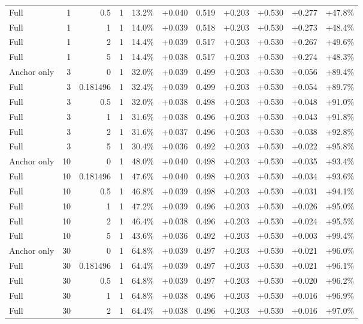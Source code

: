 \begin{table}[htbp]
\begin{tabular}{lrrrccccccc}
Full & 1 & 0.5 & 1 & 13.2\% & +0.040 & 0.519 & +0.203 & +0.530 & +0.277 & +47.8\% \\
Full & 1 & 1 & 1 & 14.0\% & +0.039 & 0.518 & +0.203 & +0.530 & +0.273 & +48.4\% \\
Full & 1 & 2 & 1 & 14.4\% & +0.039 & 0.517 & +0.203 & +0.530 & +0.267 & +49.6\% \\
Full & 1 & 5 & 1 & 14.4\% & +0.038 & 0.517 & +0.203 & +0.530 & +0.274 & +48.3\% \\
Anchor only & 3 & 0 & 1 & 32.0\% & +0.039 & 0.499 & +0.203 & +0.530 & +0.056 & +89.4\% \\
Full & 3 & 0.181496 & 1 & 32.4\% & +0.039 & 0.499 & +0.203 & +0.530 & +0.054 & +89.7\% \\
Full & 3 & 0.5 & 1 & 32.0\% & +0.038 & 0.498 & +0.203 & +0.530 & +0.048 & +91.0\% \\
Full & 3 & 1 & 1 & 31.6\% & +0.038 & 0.496 & +0.203 & +0.530 & +0.043 & +91.8\% \\
Full & 3 & 2 & 1 & 31.6\% & +0.037 & 0.496 & +0.203 & +0.530 & +0.038 & +92.8\% \\
Full & 3 & 5 & 1 & 30.4\% & +0.036 & 0.492 & +0.203 & +0.530 & +0.022 & +95.8\% \\
Anchor only & 10 & 0 & 1 & 48.0\% & +0.040 & 0.498 & +0.203 & +0.530 & +0.035 & +93.4\% \\
Full & 10 & 0.181496 & 1 & 47.6\% & +0.040 & 0.498 & +0.203 & +0.530 & +0.034 & +93.6\% \\
Full & 10 & 0.5 & 1 & 46.8\% & +0.039 & 0.498 & +0.203 & +0.530 & +0.031 & +94.1\% \\
Full & 10 & 1 & 1 & 47.2\% & +0.039 & 0.496 & +0.203 & +0.530 & +0.026 & +95.0\% \\
Full & 10 & 2 & 1 & 46.4\% & +0.038 & 0.496 & +0.203 & +0.530 & +0.024 & +95.5\% \\
Full & 10 & 5 & 1 & 43.6\% & +0.036 & 0.492 & +0.203 & +0.530 & +0.003 & +99.4\% \\
Anchor only & 30 & 0 & 1 & 64.8\% & +0.039 & 0.497 & +0.203 & +0.530 & +0.021 & +96.0\% \\
Full & 30 & 0.181496 & 1 & 64.4\% & +0.039 & 0.497 & +0.203 & +0.530 & +0.021 & +96.1\% \\
Full & 30 & 0.5 & 1 & 64.8\% & +0.039 & 0.497 & +0.203 & +0.530 & +0.020 & +96.2\% \\
Full & 30 & 1 & 1 & 64.8\% & +0.038 & 0.496 & +0.203 & +0.530 & +0.016 & +96.9\% \\
Full & 30 & 2 & 1 & 64.4\% & +0.038 & 0.496 & +0.203 & +0.530 & +0.016 & +97.0\% \\

\end{tabular}
\end{table}
